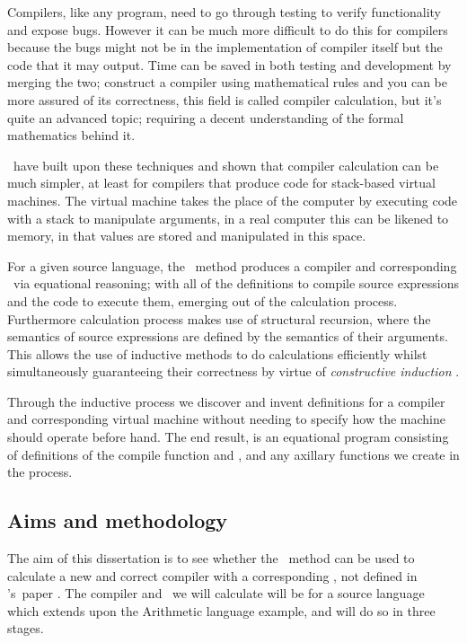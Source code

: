 \documentclass {article}
\begin{document}
Compilers, like any program, need to go through testing to
verify functionality and expose bugs. However it
can be much more difficult to do this for compilers
because the bugs might not be in the implementation of 
compiler itself but the code that it may output.
Time can be saved in both testing and development
by merging the two; construct a compiler
using mathematical rules and you can be more
assured of its correctness, this field is called
compiler calculation\cite{meijer}, 
but it's quite an
advanced topic; requiring a decent understanding 
of the formal mathematics behind it.

\BH\ have built upon these techniques and shown that
compiler calculation can be much simpler,
at least for compilers that produce code
for stack-based virtual machines.
The virtual machine takes the place of the
computer by executing code with a stack
to manipulate arguments, in a real computer
this can be likened to memory, in that
values are stored and manipulated in this space.

For a given source language, 
the \BH\ method produces
a compiler and corresponding \vm\
via equational reasoning;
with all of the definitions 
to compile source expressions
and the code to execute them,
emerging out of the calculation process.
Furthermore calculation process makes
use of structural recursion,
where the semantics of source expressions are defined
by the semantics of their arguments.
This allows the use of inductive methods
to do calculations efficiently
whilst simultaneously guaranteeing their correctness by virtue 
of \emph{constructive induction} \cite{backhouse}.

Through the inductive process we discover 
and invent definitions
for a compiler and corresponding virtual machine 
without needing to specify how the 
machine should operate before hand.
The end result, is an equational program consisting of
definitions of the compile function and \vm,
and any axillary functions we create in the process.

\subsection{Aims and methodology}

The aim of this dissertation is to
see whether the \BH\ method can
be used to calculate a new and correct compiler
with a corresponding \vm, 
not defined in \BH's\ paper \cite{bandh}.
The compiler and \vm\ we will calculate 
will be for a source language which extends 
upon the Arithmetic language example\cite[Section 2]{bandh},
and will do so in three stages.
\end{document}
